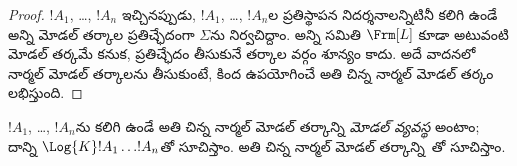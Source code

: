 \documentclass[../../../include/open-logic-section]{subfiles}
\begin{document}
\begin{proof}
  $!A_1$, \dots, $!A_n$ ఇచ్చినప్పుడు, $!A_1$, \dots, $!A_n$ల
  ప్రతిస్థాపన నిదర్శనాలన్నిటినీ కలిగి ఉండే అన్ని మోడల్ తర్కాల
  ప్రతిచ్ఛేదంగా $\Sigma$ను
  నిర్వచిద్దాం. అన్ని  సమితి
  $\Frm[L]$ కూడా అటువంటి మోడల్ తర్కమే కనుక, ప్రతిచ్ఛేదం
  తీసుకునే తర్కాల వర్గం శూన్యం కాదు. అదే వాదనలో నార్మల్
  మోడల్ తర్కాలను తీసుకుంటే, కింద ఉపయోగించే అతి చిన్న నార్మల్
  మోడల్ తర్కం లభిస్తుంది.
\end{proof}

\begin{defn}
$!A_1$, \dots, $!A_n$ను కలిగి ఉండే అతి చిన్న నార్మల్
మోడల్ తర్కాన్ని \emph{మోడల్ వ్యవస్థ} అంటాం; దాన్ని
$\Log{K} !A_1 \dots !A_n$తో సూచిస్తాం. అతి చిన్న
నార్మల్ మోడల్ తర్కాన్ని~తో సూచిస్తాం.
\end{defn}
\end{document}
